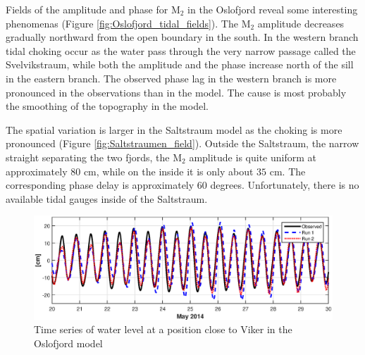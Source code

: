 Fields of the amplitude and phase for M$_2$ in the Oslofjord reveal some interesting phenomenas (Figure \ref{fig:Oslofjord_tidal_fields}). The M$_2$ amplitude decreases gradually northward from the open boundary in the south. In the western branch tidal choking occur as the water pass through the very narrow passage called the Svelvikstraum, while both the amplitude and the phase increase north of the sill in the eastern branch. The observed phase lag in the western branch is more pronounced in the observations than in the model. The cause is most probably the smoothing of the topography in the model.

The spatial variation is larger in the Saltstraum model as the choking is more pronounced (Figure \ref{fig:Saltstraumen_field}). Outside the Saltstraum, the narrow straight separating the two fjords, the M$_2$ amplitude is quite uniform at approximately $80$ cm, while on the inside it is only about $35$ cm. The corresponding phase delay is approximately $60$ degrees. Unfortunately, there is no available tidal gauges inside of the Saltstraum.







\begin{figure}[!t]
\centering
\includegraphics[width=\textwidth]{fig_Viker_timeseries}
\caption{Time series of water level at a position close to Viker in the Oslofjord model}
\label{fig:Viker_timeseries}
\end{figure}



